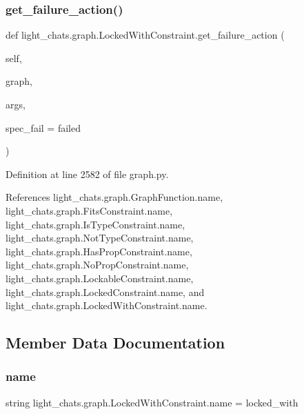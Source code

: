 \subsubsection{\texorpdfstring{get\+\_\+failure\+\_\+action()}{get\_failure\_action()}}
{\footnotesize\ttfamily def light\+\_\+chats.\+graph.\+Locked\+With\+Constraint.\+get\+\_\+failure\+\_\+action (\begin{DoxyParamCaption}\item[{}]{self,  }\item[{}]{graph,  }\item[{}]{args,  }\item[{}]{spec\+\_\+fail = {\ttfamily \textquotesingle{}failed\textquotesingle{}} }\end{DoxyParamCaption})}



Definition at line 2582 of file graph.\+py.



References light\+\_\+chats.\+graph.\+Graph\+Function.\+name, light\+\_\+chats.\+graph.\+Fits\+Constraint.\+name, light\+\_\+chats.\+graph.\+Is\+Type\+Constraint.\+name, light\+\_\+chats.\+graph.\+Not\+Type\+Constraint.\+name, light\+\_\+chats.\+graph.\+Has\+Prop\+Constraint.\+name, light\+\_\+chats.\+graph.\+No\+Prop\+Constraint.\+name, light\+\_\+chats.\+graph.\+Lockable\+Constraint.\+name, light\+\_\+chats.\+graph.\+Locked\+Constraint.\+name, and light\+\_\+chats.\+graph.\+Locked\+With\+Constraint.\+name.



\subsection{Member Data Documentation}
\mbox{\label{classlight__chats_1_1graph_1_1LockedWithConstraint_a461f74acc5853445a959b0bd17d61e4d}} 
\subsubsection{\texorpdfstring{name}{name}}
{\footnotesize\ttfamily string light\+\_\+chats.\+graph.\+Locked\+With\+Constraint.\+name = \textquotesingle{}locked\+\_\+with\textquotesingle{}\hspace{0.3cm}{\ttfamily [static]}}



